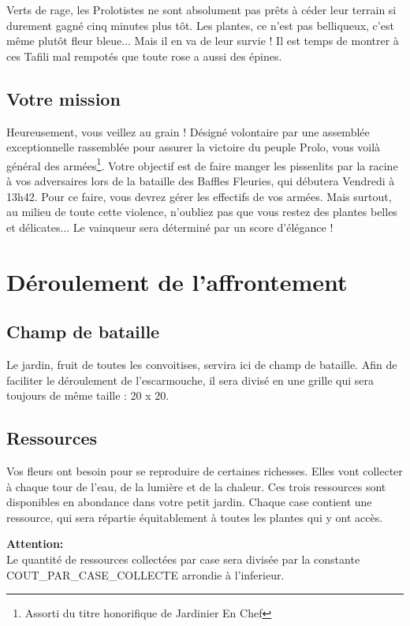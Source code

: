 Verts de rage, les Prolotistes ne sont absolument pas prêts à céder leur terrain si durement gagné cinq minutes plus tôt. Les plantes, ce n'est pas belliqueux, c'est même plutôt fleur bleue... Mais il en va de leur survie ! Il est temps de montrer à ces Tafili mal rempotés que toute rose a aussi des épines.

\subsection{Votre mission}
Heureusement, vous veillez au grain ! Désigné volontaire par une assemblée exceptionnelle rassemblée pour assurer la victoire du peuple Prolo, vous voilà général des armées\footnote{Assorti du titre honorifique de Jardinier En Chef}. Votre objectif est de faire manger les pissenlits par la racine à vos adversaires lors de la bataille des Baffles Fleuries, qui débutera Vendredi à 13h42. Pour ce faire, vous devrez gérer les effectifs de vos armées. Mais surtout, au milieu de toute cette violence, n'oubliez pas que vous restez des plantes belles et délicates... Le vainqueur sera déterminé par un score d'élégance !

\section{Déroulement de l'affrontement}

\subsection{Champ de bataille}
Le jardin, fruit de toutes les convoitises, servira ici de champ de bataille.
Afin de faciliter le déroulement de l'escarmouche, il sera divisé en une grille qui sera toujours de même taille : 20 x 20.

\subsection{Ressources}

Vos fleurs ont besoin pour se reproduire de certaines richesses. Elles vont collecter à chaque tour de l'eau, de la lumière et de la chaleur. Ces trois ressources sont disponibles en abondance dans votre petit jardin. Chaque case contient une ressource, qui sera répartie équitablement à toutes les plantes qui y ont accès.

\textbf{Attention:}\\
Le quantité de ressources collectées par case sera divisée par la constante COUT\_PAR\_CASE\_COLLECTE arrondie à l'inferieur.

